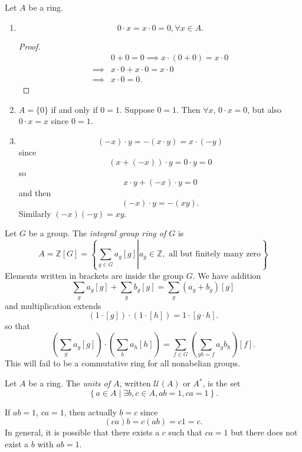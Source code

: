 \begin{obsv}
Let $A$ be a ring.
\begin{enumerate}
\item{
  $$
  0 \cdot x = x \cdot 0 = 0, \forall x \in A.
  $$
  \begin{proof}
  \begin{align*}
             & 0 + 0 = 0 \implies x \cdot (0 + 0) = x \cdot 0 \\
    \implies & x \cdot 0 + x \cdot 0 = x \cdot 0 \\
    \implies & x \cdot 0 = 0.
  \end{align*}
  \end{proof}
}
\item{
  $A = \{ 0 \}$ if and only if $0 = 1$. Suppose $0 = 1$. Then
  $\forall x$, $0 \cdot x = 0$, but also $0 \cdot x = x$ since $0 =
  1$.
}
\item{
  $$
  (-x) \cdot y = -(x \cdot y) = x \cdot (-y)
  $$
  since
  $$
  (x + (-x)) \cdot y = 0 \cdot y = 0
  $$
  so
  $$
  x \cdot y + (-x) \cdot y = 0
  $$
  and then
  $$
  (-x) \cdot y = -(xy).
  $$
  Similarly $(-x)(-y) = xy$.
}
\end{enumerate}
\end{obsv}

\begin{xmpl}
Let $G$ be a group. The \emph{integral group ring of $G$} is
$$
A = \mathbb{Z} [G]
  = \left\{ \left. \sum_{g \in G} a_g [g] \right|
            a_g \in \mathbb{Z}, \text{ all but finitely many zero}
    \right\}
$$
Elements written in brackets are inside the group $G$.
We have addition
$$
\sum_{g} a_g [g] + \sum_{g} b_g [g] = \sum_{g} (a_g + b_g)[g]
$$
and multiplication extends
$$
(1 \cdot [g]) \cdot (1 \cdot [h]) = 1 \cdot [g \cdot h].
$$
so that
$$
\left(\sum_g a_g [g]\right)
\cdot
\left(\sum_h a_h [h]\right)
=
\sum_{f \in G}
\left(\sum_{gh = f} a_g b_h \right)[f].
$$
This will fail to be a commutative ring for all nonabelian groups.
\end{xmpl}

\begin{defn}
Let $A$ be a ring. The \emph{units of $A$}, written $\mathcal{U}(A)$
or $A^\ast$, is the set
$$
\left\{ a \in A \mid \exists b, c \in A, a b = 1, c a = 1 \right\}.
$$

\begin{remark}
If $a b = 1$, $c a = 1$, then actually $b = c$ since
$$
(c a)b = c (a b) = c 1 = c.
$$
In general, it is possible that there exists a $c$ such that $c a = 1$
but there does not exist a $b$ with $a b = 1$.
\end{remark}
\end{defn}

